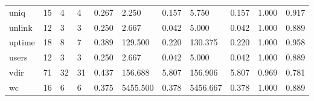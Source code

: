 \begin{longtable}{lp{1.2cm}p{1.2cm}p{1.2cm}p{1.2cm}p{1.2cm}p{1.2cm}p{1.2cm}p{1.2cm}p{1.2cm}p{1.2cm}}
uniq      &                           15 &                  4 &                                 4 &                                      0.267 &                                  2.250 &                                        0.157 &                             5.750 &                                   0.157 &                              1.000 &                                              0.917 \\
unlink    &                           12 &                  3 &                                 3 &                                      0.250 &                                  2.667 &                                        0.042 &                             5.000 &                                   0.042 &                              1.000 &                                              0.889 \\
uptime    &                           18 &                  8 &                                 7 &                                      0.389 &                                129.500 &                                        0.220 &                           130.375 &                                   0.220 &                              1.000 &                                              0.958 \\
users     &                           12 &                  3 &                                 3 &                                      0.250 &                                  2.667 &                                        0.042 &                             5.000 &                                   0.042 &                              1.000 &                                              0.889 \\
vdir      &                           71 &                 32 &                                31 &                                      0.437 &                                156.688 &                                        5.807 &                           156.906 &                                   5.807 &                              0.969 &                                              0.781 \\
wc        &                           16 &                  6 &                                 6 &                                      0.375 &                               5455.500 &                                        0.378 &                          5456.667 &                                   0.378 &                              1.000 &                                              0.889 \\

\end{longtable}
